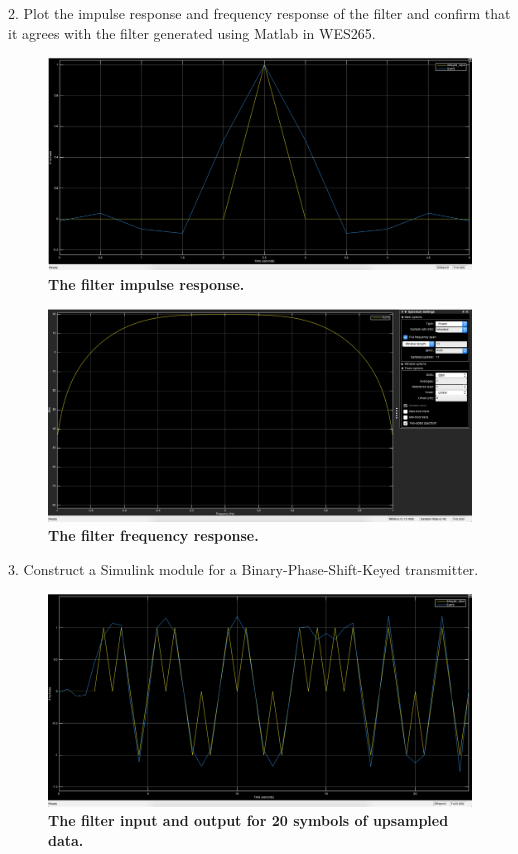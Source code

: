 \documentclass[letterpaper,12pt]{article}
\begin{document}
2. Plot the impulse response and frequency response of the filter and confirm
that it agrees with the filter generated using Matlab in WES265. 

\begin{figure}[hbtp]
\includegraphics[width=1.0\columnwidth]{prelab1-filter-impulse-response}
\caption{
\label{fig:prelab1-filter-impulse-response}
{\bf The filter impulse response.
}
}
\end{figure}

\begin{figure}[hbtp]
\includegraphics[width=1.0\columnwidth]{prelab1-filter-impulse-spectrum}
\caption{
\label{fig:prelab1-filter-impulse-spectrum}
{\bf The filter frequency response.
}
}
\end{figure}

3. Construct a Simulink module for a Binary-Phase-Shift-Keyed transmitter.

\begin{figure}[hbtp]
\includegraphics[width=1.0\columnwidth]{prelab1-filter-input-output}
\caption{
\label{fig:prelab1-filter-input-output}
{\bf The filter input and output for 20 symbols of upsampled data.
}
}
\end{figure}
\end{document}
